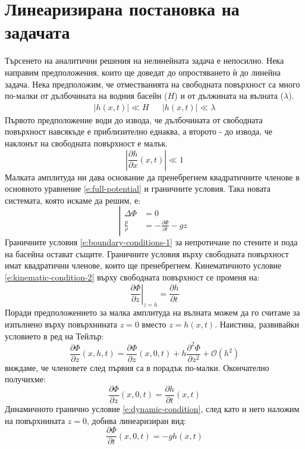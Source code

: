 \documentclass[12pt]{article}
\numberwithin{equation}{section}
\begin{document}
\section{Линеаризирана постановка на задачата}
Търсенето на аналитични решения на нелинейната задача е непосилно. Нека направим предположения, които ще доведат до опростяването ѝ до линейна задача. Нека предположим, че отместванията на свободната повърхност са много по-малки от дълбочината на водния басейн ($H$) и от дължината на вълната ($\lambda$).
\begin{align}
    \left| h(x,t) \right| \ll H && \left| h(x,t) \right| \ll \lambda
\end{align}
Първото предположение води до извода, че дълбочината от свободната повърхност навсякъде е приблизително еднаква, а второто - до извода, че наклонът на свободната повърхност е малък.
\begin{equation}
    \left| \frac{\partial h}{\partial x}(x,t) \right| \ll 1
\end{equation}
Малката амплитуда ни дава основание да пренебрегнем квадратичните членове в основното уравнение \autoref{e:full-potential} и граничните условия. Така новата системата, която искаме да решим, е:
\begin{equation}
    \label{e:main-linearized}
    \left|
    \begin{aligned}
        \Delta\Phi &= 0 \\
        \frac{p}{\rho} &= -\frac{\partial \Phi}{\partial t} - gz
    \end{aligned}
    \right.
\end{equation}
Граничните условия \autoref{e:boundary-conditions-1} за непротичане по стените и пода на басейна остават същите. Граничните условия върху свободната повърхност имат квадратични членове, които ще пренебрегнем. Кинематичното условие \autoref{e:kinematic-condition-2} върху свободната повърхност се променя на:
\begin{equation}
    \left. \frac{\partial\Phi}{\partial z} \right|_{z=h} = \frac{\partial h}{\partial t}
\end{equation}
Поради предположението за малка амплитуда на вълната можем да го считаме за изпълнено върху повърхнината $z=0$ вместо $z=h(x,t)$. Наистина, развивайки условието в ред на Тейлър:
\begin{equation}
    \frac{\partial\Phi}{\partial z}(x, h, t) = \frac{\partial\Phi}{\partial z}(x, 0, t) + h \frac{\partial^2\Phi}{\partial z^2} + \mathcal{O}(h^2)
\end{equation}
виждаме, че членовете след първия са в порадък по-малки. Окончателно получихме:
\begin{equation}
    \label{e:kinematic-condition-linearized}
    \frac{\partial\Phi}{\partial z}(x, 0, t)= \frac{\partial h}{\partial t}(x, t)
\end{equation}
Динамичното гранично условие \autoref{e:dynamic-condition}, след като и него наложим на повърхнината $z=0$, добива линеаризиран вид:
\begin{equation}
    \label{e:dynamic-condition-linearized}
    \frac{\partial\Phi}{\partial t}(x,0,t)=-gh(x,t)
\end{equation}
\end{document}
